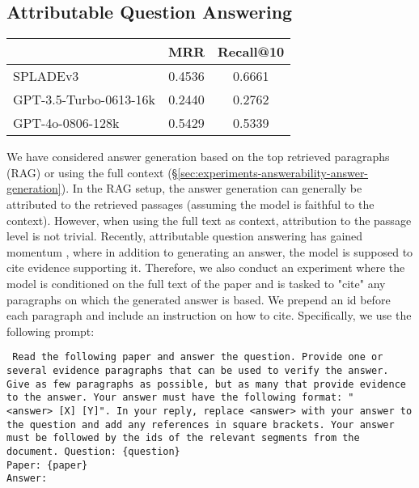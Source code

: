 \begin{multicols}{2}
\section{Attributable Question Answering}

\begin{Table}
\centering
\begin{tabular}{@{}lcc@{}}
\toprule
 & MRR & Recall@10 \\ \midrule
SPLADEv3 & 0.4536 & 0.6661 \\
GPT-3.5-Turbo-0613-16k & 0.2440 & 0.2762 \\ 
GPT-4o-0806-128k & 0.5429 & 0.5339 \\ 
\bottomrule
\end{tabular}
\label{tbl:appendix-attributable-qa-evidence-retrieval-results}
\end{Table}


We have considered answer generation based on the top retrieved paragraphs (RAG) or using the full context (\S\ref{sec:experiments-answerability-answer-generation}). In the RAG setup, the answer generation can generally be attributed to the retrieved passages (assuming the model is faithful to the context). However, when using the full text as context, attribution to the passage level is not trivial. Recently, attributable question answering has gained momentum \citep{bohnet-etal-2022-attributed,gao-etal-2023-enabling,malaviya-etal-2024-expertqa}, where in addition to generating an answer, the model is supposed to cite evidence supporting it. Therefore, we also conduct an experiment where the model is conditioned on the full text of the paper and is tasked to "cite" any paragraphs on which the generated answer is based. We prepend an id before each paragraph and include an instruction on how to cite. Specifically, we use the following prompt:

\texttt{
Read the following paper and answer the question. Provide one or several evidence paragraphs that can be used to verify the answer. Give as few paragraphs as possible, but as many that provide evidence to the answer. Your answer must have the following format: "\textless answer\textgreater\ [X] [Y]". In your reply, replace \textless answer\textgreater\ with your answer to the question and add any references in square brackets. Your answer must be followed by the ids of the relevant segments from the document.
Question: \{question\}\\
Paper: \{paper\}\\
Answer:
} 
\\


\end{multicols}
